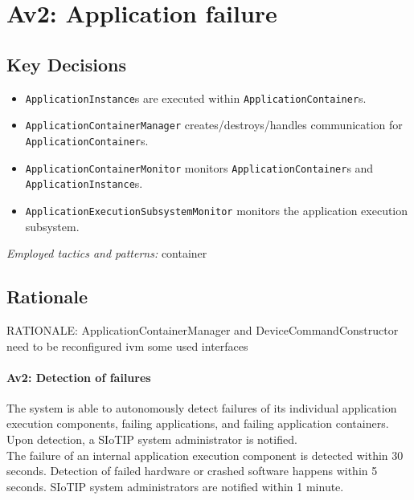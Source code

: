 \section{Av2: Application failure}

    \subsection*{Key Decisions}

        \begin{itemize}
        	\item \texttt{ApplicationInstance}s are executed within \texttt{ApplicationContainer}s.
            \item \texttt{ApplicationContainerManager} creates/destroys/handles communication for \texttt{ApplicationContainer}s.
            \item \texttt{ApplicationContainerMonitor} monitors \texttt{ApplicationContainer}s and \texttt{ApplicationInstance}s.
            \item \texttt{ApplicationExecutionSubsystemMonitor} monitors the application execution subsystem.
        \end{itemize}
        \emph{Employed tactics and patterns:} container

    \subsection*{Rationale}
        RATIONALE: ApplicationContainerManager and DeviceCommandConstructor need to be
        reconfigured ivm some used interfaces

        \paragraph{Av2: Detection of failures}
            The system is able to autonomously detect failures of its individual
            application execution components, failing applications, and failing application containers. \\
            Upon detection, a SIoTIP system administrator is notified. \\
            The failure of an internal application execution component is detected within 30 seconds.
            Detection of failed hardware or crashed software happens within 5 seconds.
            SIoTIP system administrators are notified within 1 minute.\\

